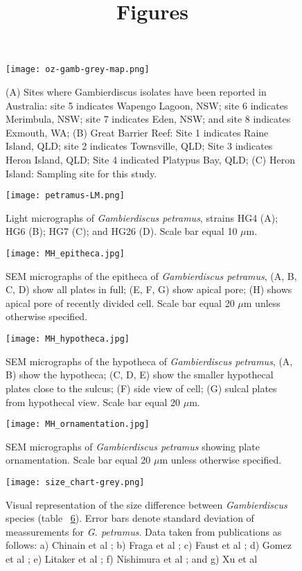 \documentclass[12pt]{article}
\title{Figures}
\begin{document}
\begin{figure} 
\texttt{[image: oz-gamb-grey-map.png]} 
\caption{(A) Sites where Gambierdiscus isolates have been reported in Australia: site 5 indicates Wapengo Lagoon, NSW; site 6 indicates Merimbula, NSW; site 7 indicates Eden, NSW; and site 8 indicates Exmouth, WA; (B) Great Barrier Reef:​ Site 1 indicates Raine Island, QLD; site 2 indicates Townsville, QLD; Site 3 indicates Heron Island, QLD; Site 4 indicated Platypus Bay, QLD; (C) Heron Island: Sampling site for this study.} 
\label{fig:OzSites}
\end{figure} 

\begin{figure} 
\texttt{[image: petramus-LM.png]} 
\caption{Light micrographs of \emph{Gambierdiscus petramus}, strains HG4 (A); HG6 (B); HG7 (C); and HG26 (D). Scale bar equal 10 $\mu$m.​} 
\label{fig:PetLM}
\end{figure} 

\FloatBarrier 
\begin{figure} 
\texttt{[image: MH\_epitheca.jpg]} 
\caption{SEM micrographs of the epitheca of \emph{Gambierdiscus petramus}, (A, B, C, D) show all plates in full; (E, F, G) show apical pore; (H) shows apical pore of recently divided cell. Scale bar equal 20 $\mu$m unless otherwise specified.} 
\label{fig:epiSEM}
\end{figure} 
\FloatBarrier 

\FloatBarrier 
\begin{figure} 
\texttt{[image: MH\_hypotheca.jpg]} 
\caption{SEM micrographs of the hypotheca of \emph{Gambierdiscus petramus}, (A, B) show the hypotheca; (C, D, E) show the smaller hypothecal plates close to the sulcus; (F) side view of cell; (G) sulcal plates from hypothecal view. Scale bar equal 20 $\mu$m.} 
\label{fig:hypoSEM}
\end{figure} 
\FloatBarrier

\FloatBarrier 
\begin{figure} 
\texttt{[image: MH\_ornamentation.jpg]} 
\caption{SEM micrographs of \emph{Gambierdiscus petramus} showing plate ornamentation. Scale bar equal 20 $\mu$m unless otherwise specified.} 
\label{fig:ornSEM}
\end{figure} 
\FloatBarrier

\FloatBarrier 
\begin{figure} 
\texttt{[image: size\_chart-grey.png]} 
\caption{Visual representation of the size difference between \emph{Gambierdiscus} species (table ~\ref{fig:SizeGraph}). Error bars denote standard deviation of meassurements for \emph{G. petramus}. Data taken from publications as follows: a) Chinain et al \citep{chinain1999morphology}; b) Fraga et al \citep{fraga2014genus}; c) Faust et al \citep{faust1995observation}; d) Gomez et al \citep{gomez2015fukuyoa}; e) Litaker et al \citep{litaker2009taxonomy}; f) Nishimura et al \citep{nishimura2014morphology}; and g) Xu et al \citep{xu2014distribution}} 
\label{fig:SizeGraph}
\end{figure} 
\FloatBarrier 
\end{document}
